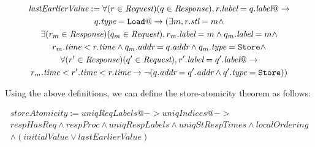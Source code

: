 \begin{defn}
\begin{multline*}
\textit{lastEarlierValue} := \forall (r \in \textit{Request}) (q \in \textit{Response}), r.\textit{label} = q.\textit{label} @-> \\
q.\textit{type} = \texttt{Load} @-> 
(\exists m, r.\textit{stl} =  m \wedge \\
\exists (r_m \in \textit{Response}) (q_m \in \textit{Request}), 
r_m.\textit{label} = m \wedge q_m.\textit{label} = m \wedge \\
r_m.\textit{time} < r.\textit{time} \wedge q_m.\textit{addr} = q.\textit{addr} \wedge q_m.\textit{type} = \texttt{Store} \wedge  \\
\forall (r' \in \textit{Response}) (q' \in \textit{Request}),
r'.\textit{label} = q'.\textit{label} @-> \\ r_m.\textit{time} < r'.\textit{time} < r.\textit{time} ->
\neg (q.\textit{addr} = q'.\textit{addr} \wedge q'.\textit{type} = \texttt{Store}))
\end{multline*}
\end{defn}

Using the above definitions, we can define the store-atomicity theorem as follows:
\begin{thm}
\begin{multline*}
storeAtomicity := \textit{uniqReqLabels} @-> \textit{uniqIndices} @-> \\
\textit{respHasReq} \wedge \textit{respProc} \wedge \textit{uniqRespLabels} \wedge
\textit{uniqStRespTimes} \wedge \textit{localOrdering}\\ \wedge 
(\textit{initialValue} \vee \textit{lastEarlierValue})
\end{multline*}
\end{thm}
